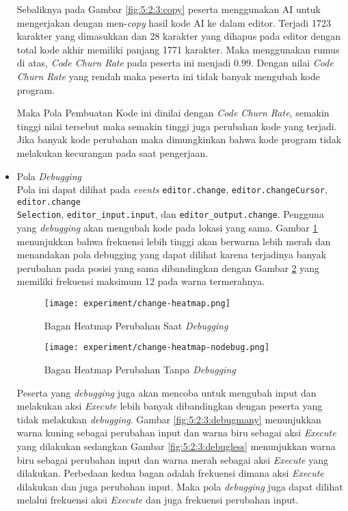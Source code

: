 \begin{itemize}
    Sebaliknya pada Gambar \ref{fig:5:2:3:copy} peserta menggunakan AI untuk mengerjakan dengan men-\textit{copy} hasil kode AI ke dalam editor. Terjadi 1723 karakter yang dimasukkan dan 28 karakter yang dihapus pada editor dengan total kode akhir memiliki panjang 1771 karakter. Maka menggunakan rumus di atas, \textit{Code Churn Rate} pada peserta ini menjadi 0.99. Dengan nilai \textit{Code Churn Rate} yang rendah maka peserta ini tidak banyak mengubah kode program.

    Maka Pola Pembuatan Kode ini dinilai dengan \textit{Code Churn Rate}, semakin tinggi nilai tersebut maka semakin tinggi juga perubahan kode yang terjadi. Jika banyak kode perubahan maka dimungkinkan bahwa kode program tidak melakukan kecurangan pada saat pengerjaan.

    \item Pola \textit{Debugging} \\
    Pola ini dapat dilihat pada \textit{events} \verb|editor.change|, \verb|editor.changeCursor|, \verb|editor.change|\\\verb|Selection|, \verb|editor_input.input|, dan \verb|editor_output.change|. Pengguna yang \textit{debugging} akan mengubah kode pada lokasi yang sama. Gambar \ref{fig:5:2:3:heatmapchange} menunjukkan bahwa frekuensi lebih tinggi akan berwarna lebih merah dan menandakan pola debugging yang dapat dilihat karena terjadinya banyak perubahan pada posisi yang sama dibandingkan dengan Gambar \ref{fig:5:2:3:heatmapchangenodebug} yang memiliki frekuensi maksimum 12 pada warna termerahnya.

    \begin{figure}[H]
        \centering
        \texttt{[image: experiment/change-heatmap.png]}
        \caption{Bagan Heatmap Perubahan Saat \textit{Debugging}}
        \label{fig:5:2:3:heatmapchange}
    \end{figure}

    \begin{figure}[H]
        \centering
        \texttt{[image: experiment/change-heatmap-nodebug.png]}
        \caption{Bagan Heatmap Perubahan Tanpa \textit{Debugging}}
        \label{fig:5:2:3:heatmapchangenodebug}
    \end{figure}
    
    Peserta yang \textit{debugging} juga akan mencoba untuk mengubah input dan melakukan aksi \textit{Execute} lebih banyak dibandingkan dengan peserta yang tidak melakukan \textit{debugging}. Gambar \ref{fig:5:2:3:debugmany} menunjukkan warna kuning sebagai perubahan input dan warna biru sebagai aksi \textit{Execute} yang dilakukan sedangkan Gambar \ref{fig:5:2:3:debugless} menunjukkan warna biru sebagai perubahan input dan warna merah sebagai aksi \textit{Execute} yang dilakukan. Perbedaan kedua bagan adalah frekuensi dimana aksi \textit{Execute} dilakukan dan juga perubahan input. Maka pola \textit{debugging} juga dapat dilihat melalui frekuensi aksi \textit{Execute} dan juga frekuensi perubahan input.


\end{itemize}
